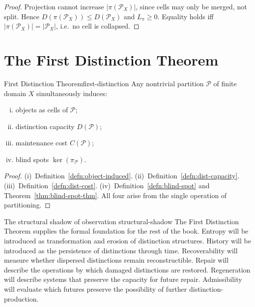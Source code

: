 \documentclass[12pt,twoside,openright]{book}
\newcommand{\partition}{\mathcal{P}}
\begin{document}
\begin{proof}
  Projection cannot increase $|\pi(\partition_X)|$, since
  cells may only be merged, not split. Hence
  $D(\pi(\partition_X)) \le D(\partition_X)$ and
  $L_\pi \ge 0$. Equality holds iff $|\pi(\partition_X)|
  = |\partition_X|$, i.e.\ no cell is collapsed.
\end{proof}

\section{The First Distinction Theorem}
\label{sec:ch1-fdt}

\begin{theorem}{First Distinction Theorem}{first-distinction}
  Any nontrivial partition $\partition$ of finite domain
  $X$ simultaneously induces:
  \begin{enumerate}[(i)]
    \item objects as cells of $\partition$;
    \item distinction capacity $D(\partition)$;
    \item maintenance cost $C(\partition)$;
    \item blind spots $\ker(\pi_\partition)$.
  \end{enumerate}
\end{theorem}

\begin{proof}
  (i)~Definition~\ref{defn:object-induced}.
  (ii)~Definition~\ref{defn:dist-capacity}.
  (iii)~Definition~\ref{defn:dist-cost}.
  (iv)~Definition~\ref{defn:blind-spot}
  and Theorem~\ref{thm:blind-spot-thm}.
  All four arise from the single operation of partitioning.
\end{proof}

\begin{remark}{The structural shadow of observation}%
  {structural-shadow}
  The First Distinction Theorem supplies the formal
  foundation for the rest of the book. Entropy will be
  introduced as transformation and erosion of distinction
  structures. History will be introduced as the persistence
  of distinctions through time. Recoverability will measure
  whether dispersed distinctions remain reconstructible.
  Repair will describe the operations by which damaged
  distinctions are restored. Regeneration will describe
  systems that preserve the capacity for future repair.
  Admissibility will evaluate which futures preserve the
  possibility of further distinction-production.
\end{remark}
\end{document}
